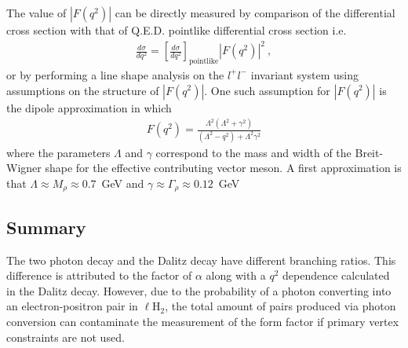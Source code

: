 The value of $\left|F(q^2)\right|$ can be directly measured by comparison of the differential cross section with that of Q.E.D. pointlike differential cross section i.e.
\begin{align}
\frac{d\sigma}{dq^{2}} = \left[\frac{d\sigma}{dq^{2}}\right]_{\text{pointlike}}\left| F(q^{2})\right| ^{2}\nonumber \ ,
\end{align}
or by performing a line shape analysis on the $l^{+}l^{-}$ invariant system using assumptions on the structure of $\left|F(q^2)\right|$. One such assumption for $\left|F(q^2)\right|$ is the dipole approximation in which 
\begin{align}
F(q^{2}) = \frac{\Lambda^2(\Lambda^2 + \gamma^2)}{(\Lambda^{2} - q^2) + \Lambda^2\gamma^2 } \nonumber
\end{align}
where the parameters $\Lambda$ and $\gamma$ correspond to the mass and width of the Breit-Wigner shape for the effective contributing vector meson. A first approximation is that $\Lambda \approx M_{\rho} \approx 0.7$~GeV and $\gamma \approx \Gamma_{\rho}  \approx 0.12$~GeV
\subsection{Summary}
The two photon decay and the Dalitz decay have different branching ratios. This difference is attributed to the factor of $\alpha$ along with a $q^2$ dependence calculated in the Dalitz decay. However, due to the probability of a photon converting into an electron-positron pair in $\ell$H$_2$, the total amount of \epem pairs produced via photon conversion can contaminate the measurement of the form factor if primary vertex constraints are not used.
 